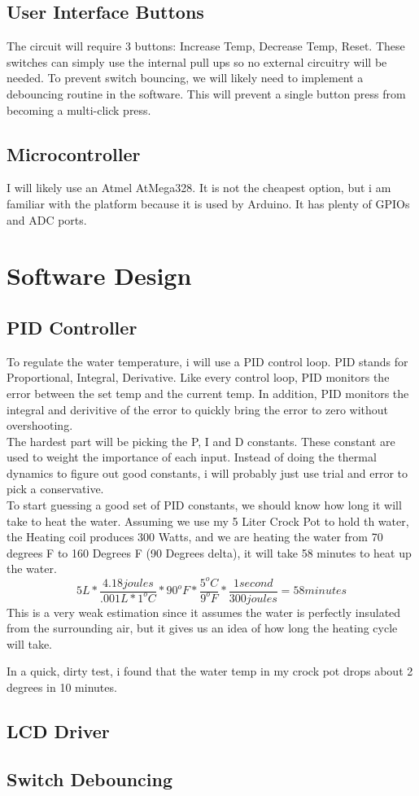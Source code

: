 \documentclass[12pt,letterpaper]{article}
\begin{document}
\subsection{User Interface Buttons}
The circuit will require 3 buttons:  Increase Temp, Decrease Temp, Reset.
These switches can simply use the internal pull ups so no external circuitry will be needed.
To prevent switch bouncing, we will likely need to implement a debouncing routine in the software.
This will prevent a single button press from becoming a multi-click press.

\subsection{Microcontroller}
I will likely use an Atmel AtMega328.
It is not the cheapest option, but i am familiar with the platform because it is used by Arduino.
It has plenty of GPIOs and ADC ports.

\section{Software Design}
\subsection{PID Controller}
To regulate the water temperature, i will use a PID control loop.
PID stands for Proportional, Integral, Derivative.  
Like every control loop, PID monitors the error between the set temp and the current temp.
In addition, PID monitors the integral and derivitive of the error to quickly bring the error to zero without overshooting.\\

The hardest part will be picking the P, I and D constants. 
These constant are used to weight the importance of each input.  
Instead of doing the thermal dynamics to figure out good constants, i will probably just use trial and error to pick a conservative.\\

To start guessing a good set of PID constants, we should know how long it will take to heat the water.
Assuming we use my 5 Liter Crock Pot to hold th water, the Heating coil produces 300 Watts, and we are heating the water from 70 degrees F to 160 Degrees F (90 Degrees delta), it will take 58 minutes to heat up the water.
\begin{equation}
5 L * \frac{4.18 joules}{.001 L * 1^oC} * 90^oF * \frac{5^oC}{9^oF} * \frac{1 second}{300 joules} = 58 minutes
\end{equation}
This is a very weak estimation since it assumes the water is perfectly insulated from the surrounding air, but it gives us an idea of how long the heating cycle will take.

In a quick, dirty test, i found that the water temp in my crock pot drops about 2 degrees in 10 minutes.


\subsection{LCD Driver}
\subsection{Switch Debouncing}
\end{document}
